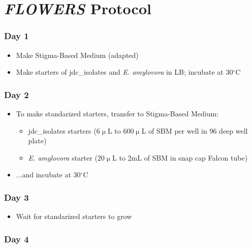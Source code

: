 \documentclass[a4paper,10pt]{article}
\begin{document}
\section*{\textit{FLOWERS} Protocol}

\subsubsection*{Day 1}

\begin{itemize}[label=\Square]

\item Make Stigma-Based Medium (adapted)
\item Make starters of jdc\_isolates and \textit{E. amylovora} in LB; incubate
at 30$^\circ$C

\end{itemize}

\subsubsection*{Day 2}

\begin{itemize}[label=\Square]

\item To make standarized starters, transfer to Stigma-Based Medium:
\begin{itemize}[label=\Square]
\item jdc\_isolates starters (6$\upmu$L to 600$\upmu$L of SBM per well in 96 deep well plate)
\item \textit{E. amylovora} starter (20$\upmu$L to 2mL of SBM in snap cap Falcon tube)
\end{itemize}
\item[] ...and incubate at 30$^\circ$C
\end{itemize}

\subsubsection*{Day 3}

\begin{itemize}[label=\Square]

\item Wait for standarized starters to grow

\end{itemize}

\subsubsection*{Day 4}
\end{document}
